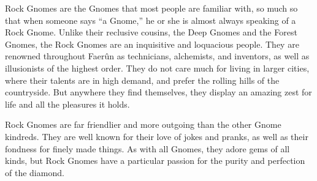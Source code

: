 
Rock Gnomes are the Gnomes that most people are familiar with, so much so that when someone says “a Gnome,” he or she is almost always speaking of a Rock Gnome. Unlike their reclusive cousins, the Deep Gnomes and the Forest Gnomes, the Rock Gnomes are an inquisitive and loquacious people. They are renowned throughout Faerûn as technicians, alchemists, and inventors, as well as illusionists of the highest order. They do not care much for living in larger cities, where their talents are in high demand, and prefer the rolling hills of the countryside. But anywhere they find themselves, they display an amazing zest for  life and all the pleasures it holds.

Rock Gnomes are far friendlier and more outgoing than the other Gnome kindreds. They are well known for their love of jokes and pranks, as well as their fondness for finely made things. As with all Gnomes, they adore gems of all kinds, but Rock Gnomes have a particular passion for the purity and perfection of the diamond.


